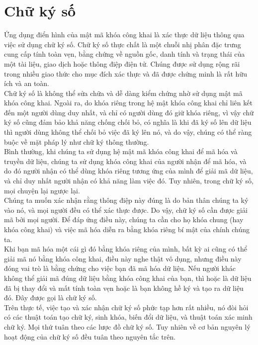 \section{Chữ ký số}

Ứng dụng điển hình của mật mã khóa công khai là xác thực dữ liệu thông qua việc sử dụng chữ ký số. Chữ ký số thực chất là một chuỗi nhị phân đặc trưng cung cấp tính toàn vẹn, bằng chứng về nguồn gốc, danh tính và trạng thái của một tài liệu, giao dịch hoặc thông điệp điện tử. Chúng được sử dụng rộng rãi trong nhiều giao thức cho mục đích xác thực và đã được chứng minh là rất hữu ích và an toàn.\\

Chữ ký số là không thể sửa chữa và dễ dàng kiểm chứng nhờ sử dụng mật mã khóa công khai. Ngoài ra, do khóa riêng trong hệ mật khóa công khai chỉ liên kết đến một người dùng duy nhất, và chỉ có người dùng đó giữ khóa riêng, vì vậy chữ ký số cũng đảm bảo khả năng chống chối bỏ, có nghĩa là khi đã ký số lên dữ liệu thì người dùng không thể chối bỏ việc đã ký lên nó, và do vậy, chúng có thể ràng buộc về mặt pháp lý như chữ ký thông thường.\\

Bình thường, khi chúng ta sử dụng hệ mật mã khóa công khai để mã hóa và truyền dữ liệu, chúng ta sử dụng khóa công khai của người nhận để mã hóa, và do đó người nhận có thể dùng khóa riêng tương ứng của mình để giải mã dữ liệu, và chỉ duy nhất người nhận có khả năng làm việc đó. Tuy nhiên, trong chữ ký số, mọi chuyện lại ngược lại.\\

Chúng ta muốn xác nhận rằng thông điệp này đúng là do bản thân chúng ta ký vào nó, và mọi người đều có thể xác thực được. Do vậy, chữ ký số cần được giải mã bởi mọi người. Để đáp ứng điều này, chúng ta cần cho họ khóa chung (hay khóa công khai) và việc mã hóa diễn ra bằng khóa riêng bí mật của chính chúng ta.\\

Khi bạn mã hóa một cái gì đó bằng khóa riêng của mình, bất kỳ ai cũng có thể giải mã nó bằng khóa công khai, điều này nghe thật vô dụng, nhưng điều này đóng vai trò là bằng chứng cho việc bạn đã mã hóa dữ liệu. Nếu người khác không thể giải mã đúng dữ liệu bằng khóa công khai của bạn, thì hoặc là dữ liệu đã bị thay đổi và mất tính toàn vẹn hoặc là bạn không hề ký và tạo ra dữ liệu đó. Đây được gọi là chữ ký số.\\

Trên thực tế, việc tạo và xác nhận chữ ký số phức tạp hơn rất nhiều, nó đòi hỏi có các thuật toán tạo chữ ký, sinh khóa, biến đổi dữ liệu, và thuật toán xác minh chữ ký. Mọi thứ tuân theo các lược đồ chữ ký số. Tuy nhiên về cơ bản nguyên lý hoạt động của chữ ký số đều tuân theo nguyên tắc trên.

